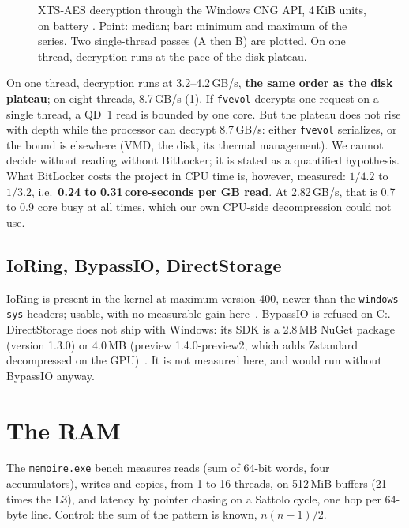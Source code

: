\begin{figure}[ht]
\centering
\GrapheAES
\caption[XTS-AES decryption versus thread count]{XTS-AES decryption through the Windows CNG API, 4\,KiB units, on battery \mes. Point: median; bar: minimum and maximum of the series. Two single-thread passes (A then B) are plotted. On one thread, decryption runs at the pace of the disk plateau.}
\label{fig:aes}
\end{figure}

On one thread, decryption runs at 3.2--4.2\,GB/s, \textbf{the same order as the disk plateau}; on eight threads, 8.7\,GB/s (\cref{fig:aes}). If \texttt{fvevol} decrypts one request on a single thread, a QD~1 read is bounded by one core. But the plateau does not rise with depth while the processor can decrypt 8.7\,GB/s: either \texttt{fvevol} serializes, or the bound is elsewhere (VMD, the disk, its thermal management). We cannot decide without reading without BitLocker; it is stated as a quantified hypothesis. What BitLocker costs the project in CPU time is, however, measured: $1/4.2$ to $1/3.2$, i.e.\ \textbf{0.24 to 0.31\,core-seconds per GB read}. At 2.82\,GB/s, that is 0.7 to 0.9 core busy at all times, which our own CPU-side decompression could not use.

\subsection{IoRing, BypassIO, DirectStorage}
IoRing is present in the kernel at maximum version 400, newer than the \texttt{windows-sys} headers; usable, with no measurable gain here~\cite{microsoft2026ioring}. BypassIO is refused on C:. DirectStorage does not ship with Windows: its SDK is a 2.8\,MB NuGet package (version 1.3.0) or 4.0\,MB (preview 1.4.0-preview2, which adds Zstandard decompressed on the GPU)~\cite{nuget2026directstorage,microsoft2026directstorage14}. It is not measured here, and would run without BypassIO anyway.

\section{The RAM}\label{sec:ram}

The \texttt{memoire.exe} bench measures reads (sum of 64-bit words, four accumulators), writes and copies, from 1 to 16 threads, on 512\,MiB buffers (21 times the L3), and latency by pointer chasing on a Sattolo cycle, one hop per 64-byte line. Control: the sum of the pattern is known, $n(n-1)/2$.


